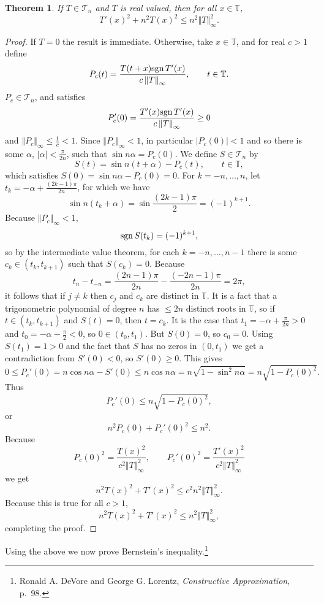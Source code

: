 \documentclass{article}
\newcommand{\sgn}{\ensuremath\mathrm{sgn}\,}
\newcommand{\norm}[1]{\left\Vert #1 \right\Vert}
\newtheorem{theorem}{Theorem}
\theoremstyle{definition}
\begin{document}
\begin{theorem}
If $T \in \mathscr{T}_n$ and $T$ is real valued, then for all $x \in \mathbb{T}$,
\[
T'(x)^2+n^2 T(x)^2 \leq n^2 \norm{T}_\infty^2.
\]
\label{szego}
\end{theorem}
\begin{proof}
If $T=0$ the result is immediate. Otherwise, take $x \in \mathbb{T}$,
and for real $c>1$ define 
\[
P_c(t)=\frac{T(t+x) \sgn T'(x)}{c \norm{T}_\infty}, \qquad t \in \mathbb{T}.
\]
$P_c \in \mathscr{T}_n$, and satisfies
\[
P_c'(0) = \frac{T'(x) \sgn T'(x)}{c \norm{T}_\infty} \geq 0
\]
and $\norm{P_c}_\infty \leq \frac{1}{c}<1$.
Since $\norm{P_c}_\infty < 1$, in particular $|P_c(0)|<1$ and so there is some
$\alpha$, $|\alpha|<\frac{\pi}{2n}$, such that $\sin n\alpha = P_c(0)$. 
We define $S \in \mathscr{T}_n$ by
\[
S(t) = \sin n(t+\alpha)-P_c(t), \qquad t \in \mathbb{T},
\]
which satisfies $S(0)=\sin n\alpha-P_c(0)=0$.
For $k=-n,\ldots,n$, let $t_k=-\alpha+\frac{(2k-1)\pi}{2n}$, for which we have
\[
\sin n(t_k+\alpha) = \sin \frac{(2k-1)\pi}{2} = (-1)^{k+1}.
\]
Because $\norm{P_c}_\infty<1$, 
\[
\sgn S(t_k) =  (-1)^{k+1},
\]
so by the intermediate value theorem, for each $k=-n,\ldots,n-1$ there is some $c_k \in (t_k,t_{k+1})$ such that
$S(c_k)=0$.
Because
\[
t_n-t_{-n} = \frac{(2n-1)\pi}{2n}-\frac{(-2n-1)\pi}{2n}=
2\pi,
\]
it follows that if $j \neq k$ then $c_j$ and $c_k$ are distinct in $\mathbb{T}$.
It is a fact that a trigonometric polynomial of degree $n$ has $\leq 2n$ distinct roots in $\mathbb{T}$, so if
$t \in (t_k,t_{k+1})$ and $S(t)=0$, then $t=c_k$. 
It is the case that $t_1=-\alpha+\frac{\pi}{2n}>0$ and $t_0=-\alpha-\frac{\pi}{2}<0$, so
$0 \in (t_0,t_1)$. But $S(0)=0$, so $c_0=0$. 
Using $S(t_1)=1>0$ and the fact that $S$ has no zeros in $(0,t_1)$ we get a contradiction from $S'(0) < 0$, so $S'(0) \geq 0$. 
This gives
\[
0 \leq P_c'(0) = n\cos n\alpha-S'(0) \leq n\cos n\alpha=n\sqrt{1-\sin^2 n\alpha} = n\sqrt{1-P_c(0)^2}.
\]
Thus
\[
P_c'(0) \leq n\sqrt{1-P_c(0)^2},
\]
or
\[
n^2 P_c(0)+P_c'(0)^2 \leq n^2.
\]
Because
\[
P_c(0)^2=\frac{T(x)^2}{c^2 \norm{T}_\infty^2}, \qquad
P_c'(0)^2 = \frac{T'(x)^2}{c^2\norm{T}_\infty^2}
\]
we get
\[
n^2 T(x)^2 + T'(x)^2 \leq c^2 n^2 \norm{T}_\infty^2.
\]
Because this is true for all $c>1$,
\[
n^2 T(x)^2 + T'(x)^2 \leq n^2 \norm{T}_\infty^2,
\]
completing the proof.
\end{proof}

Using the above we now prove Bernstein's inequality.\footnote{Ronald A. DeVore and George G. Lorentz,
{\em Constructive Approximation}, p.~98.}
\end{document}
